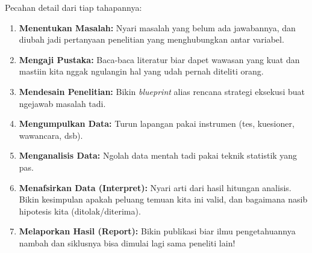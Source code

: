 \documentclass[12pt,a4paper]{article}
\begin{document}
Pecahan detail dari tiap tahapannya:
\begin{enumerate}
    \item \textbf{Menentukan Masalah:} Nyari masalah yang belum ada jawabannya, dan diubah jadi pertanyaan penelitian yang menghubungkan antar variabel.
    \item \textbf{Mengaji Pustaka:} Baca-baca literatur biar dapet wawasan yang kuat dan mastiin kita nggak ngulangin hal yang udah pernah diteliti orang.
    \item \textbf{Mendesain Penelitian:} Bikin \textit{blueprint} alias rencana strategi eksekusi buat ngejawab masalah tadi.
    \item \textbf{Mengumpulkan Data:} Turun lapangan pakai instrumen (tes, kuesioner, wawancara, dsb).
    \item \textbf{Menganalisis Data:} Ngolah data mentah tadi pakai teknik statistik yang pas.
    \item \textbf{Menafsirkan Data (Interpret):} Nyari arti dari hasil hitungan analisis. Bikin kesimpulan apakah peluang temuan kita ini valid, dan bagaimana nasib hipotesis kita (ditolak/diterima).
    \item \textbf{Melaporkan Hasil (Report):} Bikin publikasi biar ilmu pengetahuannya nambah dan siklusnya bisa dimulai lagi sama peneliti lain!
\end{enumerate}
\end{document}
